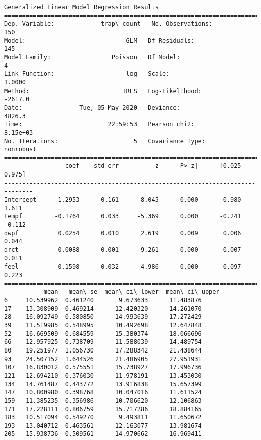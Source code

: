 \documentclass[11pt]{article}
\begin{document}
    \begin{Verbatim}[commandchars=\\\{\}]
                 Generalized Linear Model Regression Results                  
==============================================================================
Dep. Variable:             trap\_count   No. Observations:                  150
Model:                            GLM   Df Residuals:                      145
Model Family:                 Poisson   Df Model:                            4
Link Function:                    log   Scale:                          1.0000
Method:                          IRLS   Log-Likelihood:                -2617.0
Date:                Tue, 05 May 2020   Deviance:                       4826.3
Time:                        22:59:53   Pearson chi2:                 8.15e+03
No. Iterations:                     5   Covariance Type:             nonrobust
==============================================================================
                 coef    std err          z      P>|z|      [0.025      0.975]
------------------------------------------------------------------------------
Intercept      1.2953      0.161      8.045      0.000       0.980       1.611
tempf         -0.1764      0.033     -5.369      0.000      -0.241      -0.112
dwpf           0.0254      0.010      2.619      0.009       0.006       0.044
drct           0.0088      0.001      9.261      0.000       0.007       0.011
feel           0.1598      0.032      4.986      0.000       0.097       0.223
==============================================================================
           mean   mean\_se  mean\_ci\_lower  mean\_ci\_upper
6     10.539962  0.461240       9.673633      11.483876
17    13.308909  0.469214      12.420320      14.261070
28    16.092749  0.580850      14.993639      17.272429
39    11.519985  0.548995      10.492698      12.647848
52    16.669509  0.684559      15.380374      18.066696
66    12.957925  0.738709      11.588039      14.489754
80    19.251977  1.056730      17.288342      21.438644
93    24.507152  1.644526      21.486905      27.951931
107   16.830012  0.575551      15.738927      17.996736
121   12.694210  0.376030      11.978191      13.453030
134   14.761487  0.443772      13.916838      15.657399
147   10.800980  0.398768      10.047016      11.611524
159   11.385235  0.356986      10.706620      12.106863
171   17.228111  0.806759      15.717286      18.884165
183   10.517094  0.549270       9.493811      11.650672
193   13.040712  0.463561      12.163077      13.981674
205   15.938736  0.509561      14.970662      16.969411

\end{Verbatim}
\end{document}
